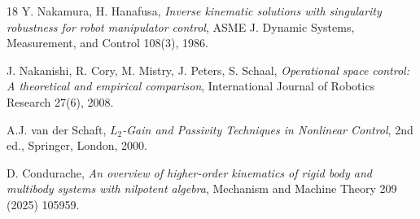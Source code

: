 \documentclass[11pt,a4paper]{article}
\theoremstyle{tndqplain}
\theoremstyle{tndqremark}
\begin{document}
\begin{thebibliography}{18}
Y. Nakamura, H. Hanafusa, \emph{Inverse kinematic solutions with singularity robustness for robot manipulator control},
ASME J. Dynamic Systems, Measurement, and Control 108(3), 1986.

J. Nakanishi, R. Cory, M. Mistry, J. Peters, S. Schaal, \emph{Operational space control: A theoretical and empirical comparison},
International Journal of Robotics Research 27(6), 2008.

A.J. van der Schaft, \emph{$L_2$-Gain and Passivity Techniques in Nonlinear Control}, 2nd ed., Springer, London, 2000.

D. Condurache, \emph{An overview of higher-order kinematics of rigid body and multibody systems with nilpotent algebra},
Mechanism and Machine Theory 209 (2025) 105959.

\end{thebibliography}
\end{document}
